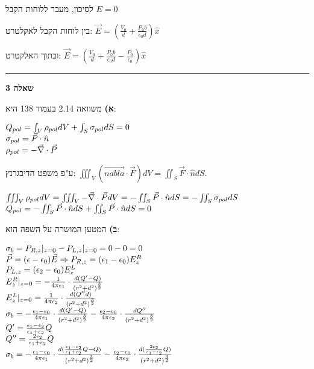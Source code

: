 \documentclass[14pt]{extarticle}
\makeatletter
\newenvironment{lefteqs}{%
    \begin{english}%
    \begin{flushleft}%
    \renewcommand{\arraystretch}{1.3}%
    $\begin{array}{@{}l@{}}%
}{%
    \end{array}$%
    \end{flushleft}%
    \end{english}%
}
\makeatother
\begin{document}
לסיכון, מעבר ללוחות הקבל $E=0$

בין לוחות הקבל לאקלטרט: $\vec{E} = (\frac{V_0}{d} + \frac{P_0 b}{\epsilon_0 d}) \hat{x}$

ובתוך האלקטרט: $\vec{E} = (\frac{V_0}{d} + \frac{P_0 b}{\epsilon_0 d} - \frac{P_0}{\epsilon_0}) \hat{x}$


\vspace{3em}
\hrule
\vspace{2em}

\textbf{\large שאלה 3}

\textbf{א)}
משוואה 2.14 בעמוד 138 היא:

\begin{lefteqs}
    Q_{pol} = \int_V \rho_{pol} dV + \int_S \sigma_{pol} dS = 0 \\
    \sigma_{pol} = \vec{P} \cdot \hat{n} \\
    \rho_{pol} = -\vec{\nabla} \cdot \vec{P}
\end{lefteqs}

ע"פ משפט הדיבגרנץ: $\iiint_V (\vec{nabla} \cdot \vec{F}) dV = \iint_S \vec{F} \cdot \hat{n} dS$.

\begin{lefteqs}
    \iiint_V \rho_{pol} dV = \iiint_V -\vec{\nabla} \cdot \vec{P} dV = -\iint_S \vec{P} \cdot \hat{n} dS = -\iint_S \sigma_{pol} dS \\
    Q_{pol} = -\iint_S \vec{P} \cdot \hat{n} dS + \iint_S \vec{P} \cdot \hat{n} dS = 0
\end{lefteqs}

\textbf{ב)}
המטען המושרה על השפה הוא:
\begin{lefteqs}
    \sigma_b = P_{R,z}|_{z=0} - P_{L,z}|_{z=0} = 0 - 0 = 0 \\
    \vec{P} = (\epsilon - \epsilon_0)\vec{E} \Rightarrow P_{R,z} = (\epsilon_1 - \epsilon_0)E_z^R \\
    P_{L,z} = (\epsilon_2 - \epsilon_0)E_z^L \\
    E_z^R|_{z=0} = -\frac{1}{4\pi\epsilon_1} \cdot \frac{d(Q' - Q)}{(r^2 + d^2)^{\frac{3}{2}}} \\
    E_z^L|_{z=0} = \frac{1}{4\pi\epsilon_2} \cdot \frac{d(Q'' d)}{(r^2 + d^2)^{\frac{3}{2}}} \\
    \sigma_b = -\frac{\epsilon_1 - \epsilon_0}{4\pi\epsilon_1} \cdot \frac{d(Q' - Q)}{(r^2+d^2)^{\frac{3}{2}}} - \frac{\epsilon_2 - \epsilon_0}{4\pi\epsilon_2} \cdot \frac{dQ''}{(r^2 + d^2)^{\frac{3}{2}}} \\
    Q' = \frac{\epsilon_1 - \epsilon_2}{\epsilon_1 + \epsilon_2} Q \\
    Q'' = \frac{2\epsilon_2}{\epsilon_1 + \epsilon_2} Q \\
    \sigma_b = -\frac{\epsilon_1 - \epsilon_0}{4\pi\epsilon_1} \cdot \frac{d(\frac{\epsilon_1 - \epsilon_2}{\epsilon_1 + \epsilon_2} Q - Q)}{(r^2 + d^2)^{\frac{3}{2}}} - \frac{\epsilon_2 - \epsilon_0}{4\pi\epsilon_2} \cdot \frac{d(\frac{2\epsilon_2}{\epsilon_1 + \epsilon_2} Q)}{(r^2 + d^2)^{\frac{3}{2}}} \\
\end{lefteqs}
\end{document}
